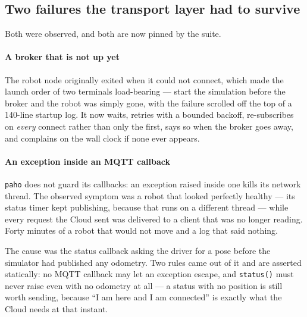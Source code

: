 \subsection{Two failures the transport layer had to survive}

Both were observed, and both are now pinned by the suite.

\paragraph{A broker that is not up yet} The robot node originally exited
when it could not connect, which made the launch order of two terminals
load-bearing --- start the simulation before the broker and the robot was
simply gone, with the failure scrolled off the top of a 140-line startup
log. It now waits, retries with a bounded backoff, re-subscribes on
\emph{every} connect rather than only the first, says so when the broker
goes away, and complains on the wall clock if none ever appears.

\paragraph{An exception inside an MQTT callback} \texttt{paho} does not
guard its callbacks: an exception raised inside one kills its network
thread. The observed symptom was a robot that looked perfectly healthy
--- its status timer kept publishing, because that runs on a different
thread --- while every request the Cloud sent was delivered to a client
that was no longer reading. Forty minutes of a robot that would not move
and a log that said nothing.

The cause was the status callback asking the driver for a pose before
the simulator had published any odometry. Two rules came out of it and
are asserted statically: no MQTT callback may let an exception escape,
and \texttt{status()} must never raise even with no odometry at all --- a
status with no position is still worth sending, because ``I am here and
I am connected'' is exactly what the Cloud needs at that instant.
